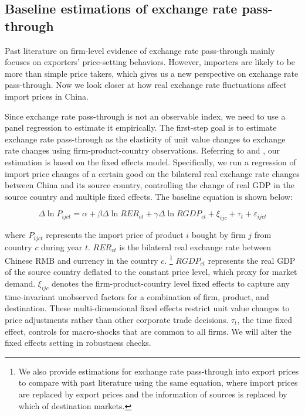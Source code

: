 \documentclass[12pt]{article}
\begin{document}
\subsection{Baseline estimations of exchange rate pass-through} \label{Empirical-Baseline}

Past literature on firm-level evidence of exchange rate pass-through mainly focuses on exporters' price-setting behaviors. However, importers are likely to be more than simple price takers, which gives us a new perspective on exchange rate pass-through. Now we look closer at how real exchange rate fluctuations affect import prices in China.

Since exchange rate pass-through is not an observable index, we need to use a panel regression to estimate it empirically. The first-step goal is to estimate exchange rate pass-through as the elasticity of unit value changes to exchange rate changes using firm-product-country observations. Referring to \cite{aik2014} and \cite{lmx2015}, our estimation is based on the fixed effects model. Specifically, we run a regression of import price changes of a certain good on the bilateral real exchange rate changes between China and its source country, controlling the change of real GDP in the source country and multiple fixed effects. The baseline equation is shown below:

\begin{equation}
	\Delta \ln P_{i j c t}=\alpha+\beta \Delta \ln R E R_{c t}+\gamma \Delta \ln R G D P_{c t}+\xi_{i j c}+\tau_{t}+\varepsilon_{i j c t}
	\label{eq.baseline}
\end{equation}

where $P_{ijct}$ represents the import price of product $i$ bought by firm $j$ from country $c$ during year $t$. $R E R_{c t}$ is the bilateral real exchange rate between Chinese RMB and currency in the country $c$. \footnote{We also provide estimations for exchange rate pass-through into export prices to compare with past literature using the same equation, where import prices are replaced by export prices and the information of sources is replaced by which of destination markets.} $RGDP_{ct}$ represents the real GDP of the source country deflated to the constant price level, which proxy for market demand. $\xi_{ijc}$ denotes the firm-product-country level fixed effects to capture any time-invariant unobserved factors for a combination of firm, product, and destination. These multi-dimensional fixed effects restrict unit value changes to price adjustments rather than other corporate trade decisions. $\tau_t$, the time fixed effect, controls for macro-shocks that are common to all firms. We will alter the fixed effects setting in robustness checks.
\end{document}
